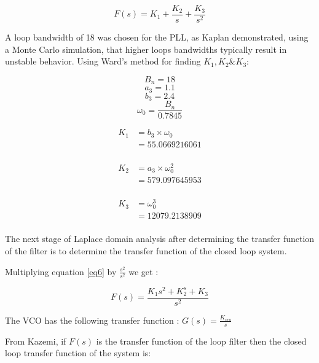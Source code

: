 \begin{equation} \label{eq6}
F(s) = K_1 + \frac{K_2}{s} + \frac{K_3}{s^2}
\end{equation}

A loop bandwidth of 18 was chosen for the \ac{PLL}, as Kaplan\cite{Kaplan} demonstrated, using a Monte Carlo simulation, that higher loops bandwidths typically result in unstable behavior. 
Using Ward's method\cite{Ward} for finding $K_1,K_2\&K_3$:

$$B_n = 18$$
$$a_3=1.1$$
$$b_3=2.4$$
$$\omega_{0}=\frac{B_n}{0.7845}$$

\begin{equation} \label{eq3}
\begin{split}
K_1 & = b_3 \times \omega_{0}\\
    & = 55.0669216061\\
\end{split}
\end{equation}

\begin{equation} \label{eq4}
\begin{split}
K_2 & = a_3 \times \omega_{0}^2\\ 
    & = 579.097645953\\
\end{split}
\end{equation}

\begin{equation} \label{eq5}
\begin{split}
K_3 & = \omega_{0}^3\\
    & = 12079.2138909\\
\end{split}
\end{equation}


The next stage of Laplace domain analysis after determining the transfer function of the filter is to determine the transfer function of the closed loop system.

Multiplying equation \ref{eq6} by $\frac{s^2}{s^2}$ we get :

\begin{equation}
F(s) = \frac{K_1s^2 + K_2^s + K_3}{s^2}
\end{equation}

The \ac{VCO} has the following transfer function : $G(s) = \frac{K_{vco}}{s}$

From Kazemi, if  $F(s)$ is the transfer function of the loop filter\cite{KazemiPHD} then the closed loop transfer function  of the system is: 

